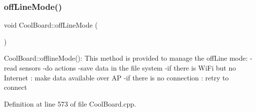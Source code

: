\subsubsection{\texorpdfstring{off\+Line\+Mode()}{offLineMode()}}
{\footnotesize\ttfamily void Cool\+Board\+::off\+Line\+Mode (\begin{DoxyParamCaption}{ }\end{DoxyParamCaption})}

Cool\+Board\+::offline\+Mode()\+: This method is provided to manage the off\+Line mode\+: -\/read sensors -\/do actions -\/save data in the file system -\/if there is Wi\+Fi but no Internet \+: make data available over AP -\/if there is no connection \+: retry to connect 

Definition at line 573 of file Cool\+Board.\+cpp.


